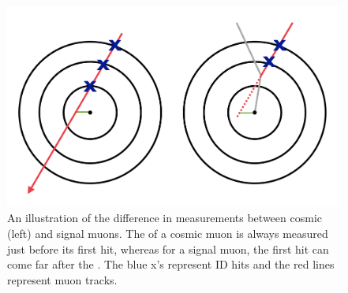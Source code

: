 \begin{figure}[htbp]
\centering
\includegraphics[width=.6\textwidth]{figures/LRT_systs/cos_sig_LRT.png}
\caption{An illustration of the difference in \dz measurements between cosmic (left) and signal muons. The \dz of a cosmic muon is always measured just before its first hit, whereas for a signal muon, the first hit can come far after the \dz. The blue x's represent \ac{ID} hits and the red lines represent muon tracks.}
\label{fig:lrt_sig_sketch}
\end{figure}


